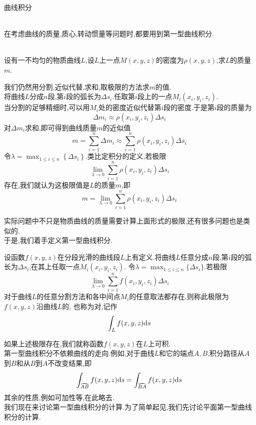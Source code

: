 \documentclass{ctexart}
\begin{document}
\pagestyle{empty}
\begin{center}\large 曲线积分\end{center}
\\
在考虑曲线的质量,质心,转动惯量等问题时,都要用到第一型曲线积分.
\begin{problem}[1.1 物质曲线的质量]
    \\设有一不均匀的物质曲线$L$,设$L$上一点$M(x,y,z)$的密度为$\rho(x,y,z)$,求$L$的质量$m$.
\end{problem}
\begin{solution}
    我们仍然用分割,近似代替,求和,取极限的方法求$m$的值.\\
    将曲线$L$分成$n$段,第$i$段的弧长为$\Delta s_i$.任取第$i$段上的一点$M_i(x_i,y_i,z_i)$.\\
    当分割的足够精细时,可以用$M_i$处的密度近似代替第$i$段的密度.于是第$i$段的质量为
    \[\Delta m_i\approx \rho(x_i,y_i,z_i)\Delta s_i\]
    对$\Delta m_i$求和,即可得到曲线质量$m$的近似值
    \[m=\sum_{i=1}^{n}\Delta m_i\approx\sum_{i=1}^{n}\rho(x_i,y_i,z_i)\Delta s_i\]
    令$\displaystyle\lambda=\max_{1\leqslant i\leqslant n}\left\{\Delta s_i\right\}$.类比定积分的定义,若极限
    \[\lim_{\lambda\to0}\sum_{i=1}^{n}\rho(x_i,y_i,z_i)\Delta s_i\]
    存在,我们就认为这极限值是$L$的质量$m$,即
    \[m=\lim_{\lambda\to0}\sum_{i=1}^{n}\rho(x_i,y_i,z_i)\Delta s_i\]
\end{solution}\noindent
实际问题中不只是物质曲线的质量需要计算上面形式的极限,还有很多问题也是类似的.\\
于是,我们着手定义第一型曲线积分.
\begin{definition}[1.2 定义:第一型曲线积分]
    设函数$f(x,y,z)$在分段光滑的曲线段$L$上有定义.将曲线$L$任意分成$n$段,第$i$段的弧长为$\Delta s_i$,在其上任取一点$M_i(x_i,y_i,z_i)$.%
    令$\displaystyle\lambda=\max_{1\leqslant i\leqslant n}\{\Delta s_i\}$.若极限
    \[\lim_{\lambda\to0}\sum_{i=1}^{n}f(x_i,y_i,z_i)\Delta s_i\]
    对于曲线$L$的任意分割方法和各中间点$M_i$的任意取法都存在,则称此极限为$f(x,y,z)$沿曲线$L$的,%
    也称为对,记作
    \[\int_{L}f(x,y,z)\mathrm{d} s\]
\end{definition}\noindent
如果上述极限存在,我们就称函数$f(x,y,z)$在$L$上可积.\\
第一型曲线积分不依赖曲线的走向.例如,对于曲线$L$和它的端点$A,B$,积分路径从$A$到$B$和从$B$到$A$不改变结果,即
\[\int_{\wideparen{AB}}f(x,y,z)\di s=\int_{\wideparen{BA}}f(x,y,z)\di s\]
其余的性质,例如可加性等,在此略去.\\
我们现在来讨论第一型曲线积分的计算.为了简单起见,我们先讨论平面第一型曲线积分的计算.
\end{document}
